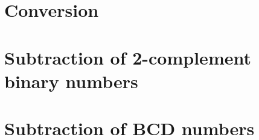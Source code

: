 \documentclass[11pt,a4paper]{article}
\author{Christian Rinderknecht}
\date{11 October 2006}
\begin{document}
\maketitle
\thispagestyle{empty}

\section{Conversion}


 
\section{Subtraction of 2-complement binary numbers}



\section{Subtraction of BCD numbers}


\end{document}
